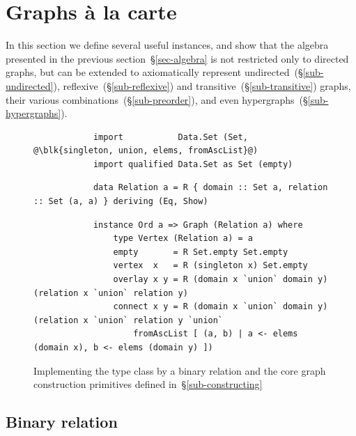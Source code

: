 \section{Graphs \`{a} la carte}\label{sec-a-la-carte}

In this section we define several useful  instances, and
show that the algebra presented in the previous section~\S\ref{sec-algebra} is
not restricted only
to directed graphs, but can be extended to axiomatically represent
undirected~(\S\ref{sub-undirected}), reflexive~(\S\ref{sub-reflexive})
and transitive~(\S\ref{sub-transitive}) graphs, their various
combinations~(\S\ref{sub-preorder}), and even hypergraphs~(\S\ref{sub-hypergraphs}).

\begin{figure}
\begin{verbatim}
            import           Data.Set (Set, @\blk{singleton, union, elems, fromAscList}@)
            import qualified Data.Set as Set (empty)
\end{verbatim}
\vspace{1mm}
\begin{verbatim}
            data Relation a = R { domain :: Set a, relation :: Set (a, a) } deriving (Eq, Show)
\end{verbatim}
\vspace{1mm}
\begin{verbatim}
            instance Ord a => Graph (Relation a) where
                type Vertex (Relation a) = a
                empty       = R Set.empty Set.empty
                vertex  x   = R (singleton x) Set.empty
                overlay x y = R (domain x `union` domain y) (relation x `union` relation y)
                connect x y = R (domain x `union` domain y) (relation x `union` relation y `union`
                    fromAscList [ (a, b) | a <- elems (domain x), b <- elems (domain y) ])
\end{verbatim}
\vspace{-2mm}
\caption{Implementing the  type class by a binary relation
and the core graph construction primitives
defined in~\S\ref{sub-constructing}\label{fig-relation}}
\vspace{-2mm}
\end{figure}

\subsection{Binary relation}\label{sub-relation}

